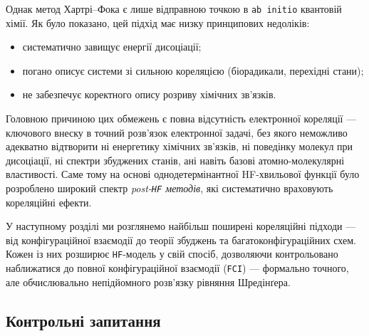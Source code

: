 Однак метод Хартрі–Фока є лише відправною точкою в \texttt{ab initio}
квантовій хімії. Як було показано, цей підхід має низку принципових
недоліків:
\begin{itemize}
    \item систематично завищує енергії дисоціації;
    \item погано описує системи зі сильною кореляцією
          (біорадикали, перехідні стани);
    \item не забезпечує коректного опису розриву хімічних зв’язків.
\end{itemize}

Головною причиною цих обмежень є повна відсутність
електронної кореляції --- ключового внеску в точний розв’язок
електронної задачі, без якого неможливо адекватно відтворити ні
енергетику хімічних зв’язків, ні поведінку молекул при дисоціації,
ні спектри збуджених станів, ані навіть базові
атомно-молекулярні властивості. Саме тому на основі однодетермінантної
HF-хвильової функції було розроблено широкий спектр
\textit{post-\texttt{HF} методів}, які систематично враховують кореляційні ефекти.

У наступному розділі ми розглянемо найбільш поширені кореляційні
підходи --- від конфігураційної взаємодії
до теорії збуджень та багатоконфігураційних схем. Кожен із них
розширює \texttt{HF}-модель у свій спосіб, дозволяючи контрольовано наближатися
до повної конфігураційної взаємодії (\texttt{FCI}) --- формально точного,
але обчислювально непідйомного розв’язку рівняння Шредінґера.



\subsection*{Контрольні запитання}

